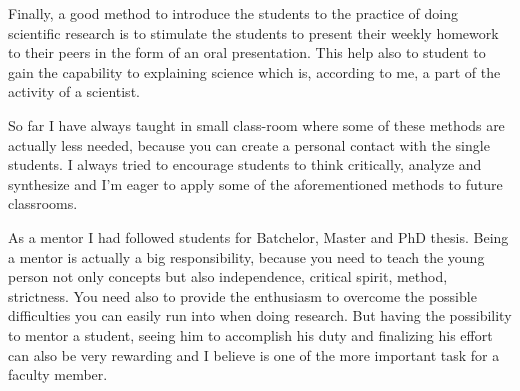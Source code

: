 \documentclass[12pt,a4paper]{article}
\begin{document}
Finally, a good method to introduce the students to the practice of
doing scientific research is to stimulate the students to present
their weekly homework to their peers in the form of an oral
presentation. This help also to student to gain the capability to
explaining science which is, according to me, a part of the activity
of a scientist. 

So far I have always taught in small class-room where some of these
methods are actually less needed, because you can create a personal
contact with the single students. I always tried to encourage students
to think critically,  analyze and synthesize and I'm eager to apply
some of the aforementioned methods to future classrooms.

As a mentor I had followed students for Batchelor, Master
and PhD thesis. Being a mentor is actually a big
responsibility, because you need to teach the young person not only
concepts but also independence, critical spirit, method,
strictness. 
You need also to provide the enthusiasm to overcome the
possible difficulties you can easily run into when doing research. But
having the possibility to mentor a student, seeing him to accomplish
his duty and finalizing his effort can also be very rewarding and I
believe is one of the more important task for a faculty member. 


\printbibliography[title=References]
\end{document}
